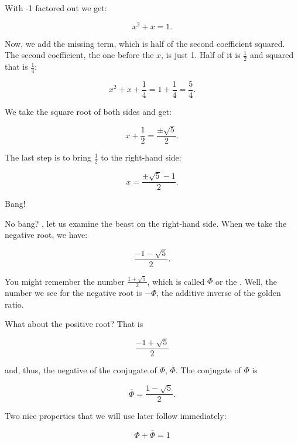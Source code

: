 \documentclass[tikz]{scrreprt}
\begin{document}
With -1 factored out we get:


\begin{equation}
x^2 + x = 1.
\end{equation}


Now, we add the missing term, which is half of the
second coefficient squared. The second coefficient,
the one before the $x$, is just 1. Half of it is $\frac{1}{2}$
and squared that is $\frac{1}{4}$:

\begin{equation}
x^2 + x + \frac{1}{4} = 1 + \frac{1}{4} = \frac{5}{4}.
\end{equation}

We take the square root of both sides and get:

\begin{equation}
x + \frac{1}{2} = \frac{\pm\sqrt{5}}{2}.
\end{equation}

The last step is to bring $\frac{1}{2}$ to the right-hand side:

\begin{equation}
x = \frac{\pm\sqrt{5}-1}{2}.
\end{equation}

Bang!

No bang? , let us examine the beast on the right-hand side.
When we take the negative root, we have:

\[
\frac{-1-\sqrt{5}}{2}.
\]

You might remember the number $\frac{1+\sqrt{5}}{2}$,
which is called $\Phi$ or the .
Well, the number we see for the negative root is
$-\Phi$, the additive inverse of the golden ratio.

What about the positive root? That is

\[
\frac{-1+\sqrt{5}}{2}
\]

and, thus, the negative of the conjugate of $\Phi$,
$\overline{\Phi}$.
The conjugate of $\Phi$ is 

\begin{equation}
\overline{\Phi} = \frac{1 - \sqrt{5}}{2}.
\end{equation}

Two nice properties that we will use later follow immediately:

\begin{equation}
\Phi + \overline{\Phi} = 1
\end{equation}
\end{document}
